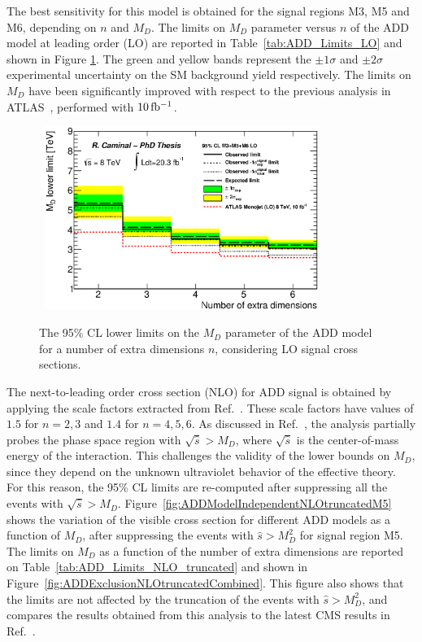 The best sensitivity for this model is obtained for the signal regions M3, M5 and M6, depending on $n$ and $M_D$.
The limits on $M_D$ parameter versus $n$ of the ADD model at leading order (LO) are reported in Table~\ref{tab:ADD_Limits_LO} and shown in Figure \ref{fig:ADDExclusionLOCombined}.
The green and yellow bands represent the $\pm 1\sigma$ and $\pm 2\sigma$ experimental uncertainty on the SM background yield respectively.
The limits on $M_D$ have been significantly improved with respect to the previous analysis in ATLAS~\cite{ATLAS:2012zim}, performed with $\unit[10]{fb^{-1}}$.



\begin{figure}[!ht]
\begin{center}
\mbox{
\includegraphics[width=0.795\textwidth]{Interpretations/Figures/plotExclusionADD_LO_combined_Stop_A4_A9_A10.eps}
}
\end{center}
\caption{The 95\% CL lower limits on the $M_D$ parameter of the ADD model for a number of extra dimensions $n$, considering LO signal cross sections.}
\label{fig:ADDExclusionLOCombined}
\end{figure}

The next-to-leading order cross section (NLO) for ADD signal is obtained by applying the scale factors extracted from Ref.~\cite{CMS:rwa}. 
These scale factors have values of $1.5$ for $n=2, 3$ and $1.4$ for $n=4, 5, 6$.
As discussed in Ref.~\cite{ATLAS:2012ky}, the analysis partially probes the phase space region with $\sqrt{\hat{s}}>M_D$, where $\sqrt{\hat{s}}$ is the center-of-mass energy of the interaction.
This challenges the validity of the lower bounds on $M_D$, since they depend on the unknown ultraviolet behavior of the effective theory.
For this reason, the 95\% CL limits are re-computed after suppressing all the events with $\sqrt{\hat{s}}>M_D$.
Figure~\ref{fig:ADDModelIndependentNLOtruncatedM5} shows the variation of the visible cross section for different ADD models as a function of $M_D$, after suppressing the events with $\hat{s} > M_D^2$ for signal region M5.
The limits on $M_D$ as a function of the number of extra dimensions are reported on Table~\ref{tab:ADD_Limits_NLO_truncated} and shown in Figure~\ref{fig:ADDExclusionNLOtruncatedCombined}.
This figure also shows that the limits are not affected by the truncation of the events with $\hat{s} > M_D^2$, and compares the results obtained from this analysis to the latest CMS results in Ref.~\cite{CMS:rwa}.

